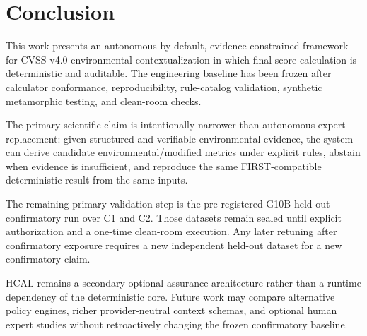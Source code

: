 \section{Conclusion}
\label{sec:conclusion}

This work presents an autonomous-by-default, evidence-constrained framework for
CVSS v4.0 environmental contextualization in which final score calculation is
deterministic and auditable. The engineering baseline has been frozen after
calculator conformance, reproducibility, rule-catalog validation, synthetic
metamorphic testing, and clean-room checks.

The primary scientific claim is intentionally narrower than autonomous expert
replacement: given structured and verifiable environmental evidence, the
system can derive candidate environmental/modified metrics under explicit
rules, abstain when evidence is insufficient, and reproduce the same
FIRST-compatible deterministic result from the same inputs.

The remaining primary validation step is the pre-registered G10B held-out
confirmatory run over C1 and C2. Those datasets remain sealed until explicit
authorization and a one-time clean-room execution. Any later retuning after
confirmatory exposure requires a new independent held-out dataset for a new
confirmatory claim.

HCAL remains a secondary optional assurance architecture rather than a runtime
dependency of the deterministic core. Future work may compare alternative
policy engines, richer provider-neutral context schemas, and optional human
expert studies without retroactively changing the frozen confirmatory
baseline.
